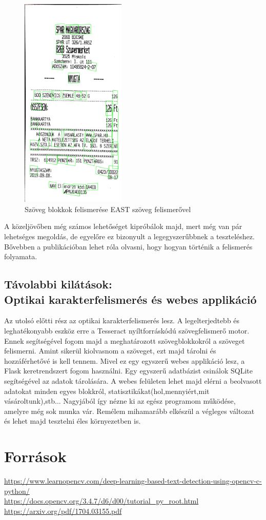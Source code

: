 \documentclass[a4paper,12pt]{article}
\begin{document}
\newpage
\begin{figure}[h]
	\centering
	\includegraphics[width=5cm]{out}
	\caption{Szöveg blokkok felismerése EAST szöveg felismerővel}
\end{figure}

A közeljövőben még számos lehetőséget kipróbálok majd, mert még van pár lehetséges megoldás, de egyelőre ez bizonyult a legegyszerűbbnek a teszteléshez. Bővebben a publikációban lehet róla olvasni, hogy hogyan történik a felismerés folyamata. 

\subsection{Távolabbi kilátások: \\Optikai karakterfelismerés és webes applikáció}
Az utolsó előtti rész az optikai karakterfelismerés lesz. A legelterjedtebb és leghatékonyabb eszköz erre a Tesseract nyíltforráskódú szövegfelismerő motor. Ennek segítségével fogom majd a meghatározott szövegblokkokról a szöveget felismerni. 
Amint sikerül kiolvasnom a szöveget, ezt majd tárolni és hozzáférhetővé is kell tennem. Mivel ez egy egyszerű webes applikáció lesz, a Flask keretrendszert fogom használni. Egy egyszerű adatbázist csinálok SQLite segítségével az adatok tárolására. A webes felületen lehet majd elérni a beolvasott adatokat minden egyes blokkról, statisztikákat(hol,mennyiért,mit vásároltunk),stb...
Nagyjából így nézne ki az egész programom működése, amelyre még sok munka vár. Remélem mihamarább elkészül a végleges változat és lehet majd tesztelni éles környezetben is. \

\newpage
\section{Források}
\url{https://www.learnopencv.com/deep-learning-based-text-detection-using-opencv-c-python/}
\\
\url{https://docs.opencv.org/3.4.7/d6/d00/tutorial_py_root.html}
\\
\url{https://arxiv.org/pdf/1704.03155.pdf}
\end{document}
